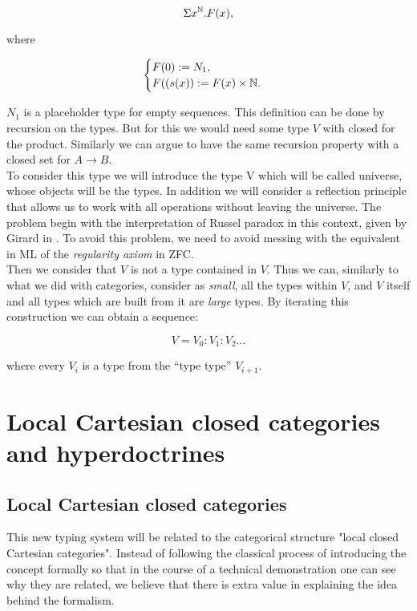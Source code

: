 $$\Sigma x^{\mathbb{N}}. F(x),$$

where

\[   
  \begin{cases}
    F(0):= N_1,\\
    F((s(x)):= F(x)\times \mathbb{N}.
  \end{cases}
\]

$N_1$ is a placeholder type for empty sequences. This definition can be done by recursion on the types. But for this we would need some type $V$ with closed for the product. Similarly we can argue to have the same recursion property with a closed set for $A \to B$.\\ 

To consider this type we will introduce the type V which will be called universe, whose objects will be the types. In addition we will consider a reflection principle that allows us to work with all operations without leaving the universe.  The problem begin with the interpretation of Russel paradox in this context, given by Girard in \cite{girard1972interpretation}. To avoid this problem, we need to avoid messing with the equivalent in ML of the \emph{regularity axiom} in ZFC.\\


Then we consider that $V$ is not a type contained in $V$. Thus we can, similarly to what we did with categories, consider as \emph{small}, all the types within $V$, and $V$ itself and all types which are built from it are \emph{large} types. By iterating this construction we can obtain a sequence:

$$V = V_0 : V_1 : V_2 ...$$

where every $V_i$ is a type from the ``type type'' $V_{i+1}$. 


\section{Local Cartesian closed categories and hyperdoctrines}
\subsection{Local Cartesian closed categories}
This new typing system will be related to the categorical structure "local closed Cartesian categories". Instead of following the classical process of introducing the concept formally so that in the course of a technical demonstration one can see why they are related, we believe that there is extra value in explaining the idea behind the formalism.\\


